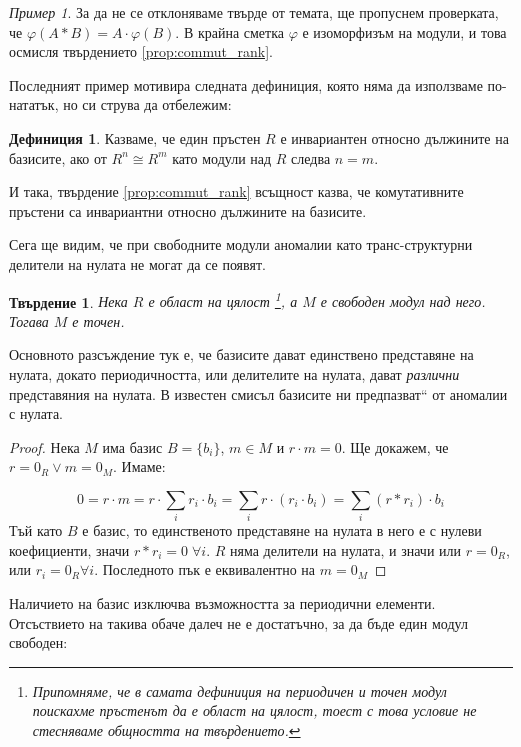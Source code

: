 \documentclass{article}
\newif\ifusemulticols
\theoremstyle{definition}
\newtheorem{deff}{Дефиниция}
\theoremstyle{remark}
\newtheorem{example}{Пример}[section]
\theoremstyle{plain}
\theoremstyle{plain}
\newtheorem{prop}[theorem]{Твърдение}
\newenvironment{mymulticols}
    { \ifusemulticols \begin{multicols}{2} \fi }
    { \ifusemulticols \end{multicols} \fi }
\begin{document}
\begin{mymulticols}
\begin{example}
    За да не се отклоняваме твърде от темата, ще пропуснем проверката, че $\varphi(A * B) = A\cdot
    \varphi(B)$. В крайна сметка $\varphi$ е изоморфизъм на модули, и това осмисля твърдението
    \ref{prop:commut_rank}.
\end{example}

Последният пример мотивира следната дефиниция, която няма да използваме по-нататък, но си струва да
отбележим:

\begin{deff}
    Казваме, че един пръстен $R$ е инвариантен относно дължините на базисите, ако от $R^n \cong R^m$
    като модули над $R$ следва $n=m$.
\end{deff}

И така, твърдение \ref{prop:commut_rank} всъщност казва, че комутативните пръстени са инвариантни
относно дължините на базисите.

Сега ще видим, че при свободните модули аномалии като транс-структурни делители на нулата не могат да се появят.

\begin{prop}
    Нека $R$ е област на цялост%
    \footnote{Припомняме, че в самата дефиниция на периодичен и точен модул поискахме пръстенът да е
    област на цялост, тоест с това условие не стесняваме общността на твърдението.},
    а $M$ е свободен модул над него. Тогава $M$ е точен.
\end{prop}

Основното разсъждение тук е, че базисите дават единствено представяне на нулата, докато
периодичността, или делителите на нулата, дават \emph{различни} представяния на нулата. В известен
смисъл базисите ни \quotedblbase предпазват`` от аномалии с нулата.

\begin{proof}
    Нека $M$ има базис $B=\{b_i\}$, $m \in M$ и $r\cdot m = 0$. Ще докажем, че $r = 0_R \lor m=0_M$. Имаме:

    $$0 = r \cdot m = r \cdot \sum_i r_i \cdot b_i = \sum_i r \cdot (r_i \cdot b_i)=\sum_i (r*r_i)\cdot b_i$$
    Тъй като $B$ е базис, то единственото представяне на нулата в него е с нулеви коефициенти, значи
    $r*r_i = 0 \; \forall i$. $R$ няма делители на нулата, и значи или $r = 0_R$, или $r_i = 0_R
    \forall i$. Последното пък е еквивалентно на $m = 0_M$
\end{proof}

Наличието на базис изключва възможността за периодични елементи. Отсъствието на такива обаче далеч
не е достатъчно, за да бъде един модул свободен:


\end{mymulticols}
\end{document}
